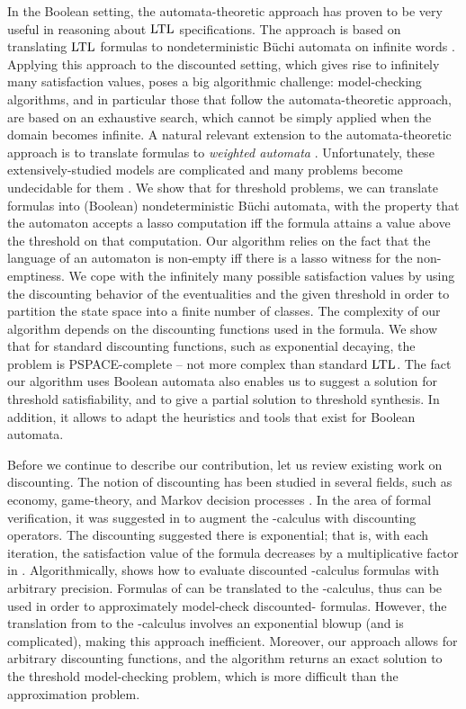 \documentclass{llncs}
\newcommand{\LTL}{{\ensuremath{\rm LTL}}\xspace}
\begin{document}
In the Boolean setting, the automata-theoretic approach has proven to be very useful in reasoning about \LTL specifications. The approach is based on translating \LTL formulas to nondeterministic B\"uchi automata on infinite words \cite{VW86b}.
Applying this approach to the discounted setting, which gives rise to infinitely many satisfaction values, poses a big algorithmic challenge: model-checking algorithms, and in particular those that follow the automata-theoretic approach, are based on an exhaustive search, which cannot be simply applied when the domain becomes infinite.
A natural relevant extension to the automata-theoretic approach is to translate formulas to {\em weighted automata} \cite{Moh97}. Unfortunately, these extensively-studied models are complicated and many problems become undecidable for them \cite{Kro94}.
We show that for threshold problems, we can translate  formulas into (Boolean) nondeterministic B\"uchi automata, with the property that the automaton accepts a lasso computation iff the formula attains a value above the threshold on that computation.
Our algorithm relies on the fact that the language of an automaton is non-empty iff there is a lasso witness for the non-emptiness.
We cope with the infinitely many possible satisfaction values by using the discounting behavior of the eventualities and the given threshold in order to partition the state space into a finite number of classes.
The complexity of our algorithm depends on the discounting functions used in the formula.
We show that for standard discounting functions, such as exponential decaying, the problem is PSPACE-complete -- not more complex than standard \LTL. 
The fact our algorithm uses Boolean automata also enables us to suggest a solution for threshold satisfiability, and to give a partial solution to threshold synthesis. In addition, it allows to adapt the heuristics and tools that exist for Boolean automata.

Before we continue to describe our contribution, let us review existing work on discounting.
The notion of discounting has been studied in several fields, such as economy, game-theory, and Markov decision processes \cite{Sha53}. In the area of formal verification, it was suggested in
\cite{AHM03} to augment the -calculus with discounting operators. The discounting suggested there is exponential; that is, with each iteration, the satisfaction value of the formula decreases by a multiplicative factor in . Algorithmically, \cite{AHM03} shows how to evaluate discounted -calculus formulas with arbitrary precision. Formulas of  can be translated to the -calculus, thus \cite{AHM03} can be used in order to approximately model-check discounted- formulas. However, the translation from  to the -calculus involves an exponential blowup \cite{Dam94} (and is complicated), making this approach inefficient. Moreover, our approach allows for arbitrary discounting functions, and the algorithm returns an exact solution to the threshold model-checking problem, which is more difficult than the approximation problem.
\end{document}
